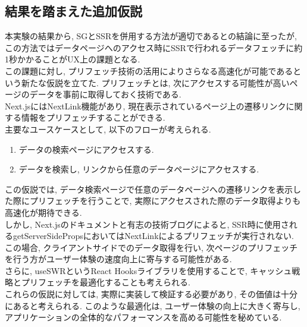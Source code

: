 \subsection{結果を踏まえた追加仮説}
本実験の結果から, SGとSSRを併用する方法が適切であるとの結論に至ったが, この方法ではデータページへのアクセス時にSSRで行われるデータフェッチに約1秒かかることがUX上の課題となる. \\
この課題に対し, プリフェッチ技術の活用によりさらなる高速化が可能であるという新たな仮説を立てた. 
プリフェッチとは, 次にアクセスする可能性が高いページのデータを事前に取得しておく技術である. \\
Next.jsにはNextLink機能があり, 現在表示されているページ上の遷移リンクに関する情報をプリフェッチすることができる. \\
主要なユースケースとして, 以下のフローが考えられる.

\begin{enumerate}
	\item データの検索ページにアクセスする.
	\item データを検索し, リンクから任意のデータページにアクセスする.
\end{enumerate}

この仮説では, データ検索ページで任意のデータページへの遷移リンクを表示した際にプリフェッチを行うことで, 実際にアクセスされた際のデータ取得よりも高速化が期待できる. \\
しかし, Next.jsのドキュメントと有志の技術ブログによると, SSR時に使用されるgetServerSidePropsにおいてはNextLinkによるプリフェッチが実行されない. 
この場合, クライアントサイドでのデータ取得を行い, 次ページのプリフェッチを行う方がユーザー体験の速度向上に寄与する可能性がある.\cite{no9} \\
さらに, useSWRというReact Hooksライブラリを使用することで, キャッシュ戦略とプリフェッチを最適化することも考えられる.\cite{no10} \\
これらの仮説に対しては, 実際に実装して検証する必要があり, その価値は十分にあると考えられる. 
このような最適化は, ユーザー体験の向上に大きく寄与し, アプリケーションの全体的なパフォーマンスを高める可能性を秘めている. 


